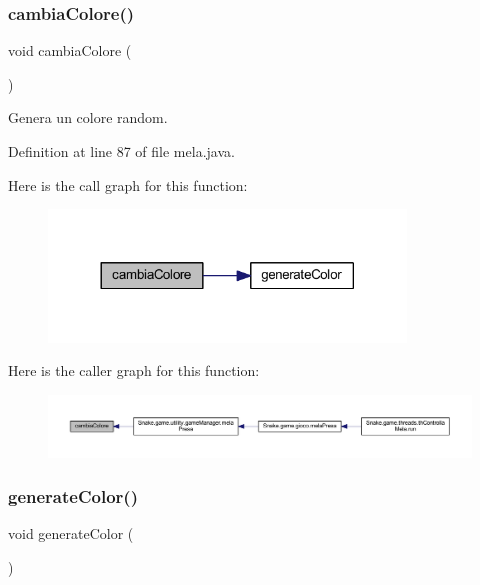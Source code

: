 \subsubsection{\texorpdfstring{cambia\+Colore()}{cambiaColore()}}
{\footnotesize\ttfamily void cambia\+Colore (\begin{DoxyParamCaption}{ }\end{DoxyParamCaption})}



Genera un colore random. 



Definition at line 87 of file mela.\+java.

Here is the call graph for this function\+:
\nopagebreak
\begin{figure}[H]
\begin{center}
\leavevmode
\includegraphics[width=269pt]{class_snake_1_1game_1_1vipera_1_1mela_a728ec55c7b71728d444fd811341f704c_cgraph}
\end{center}
\end{figure}
Here is the caller graph for this function\+:
\nopagebreak
\begin{figure}[H]
\begin{center}
\leavevmode
\includegraphics[width=350pt]{class_snake_1_1game_1_1vipera_1_1mela_a728ec55c7b71728d444fd811341f704c_icgraph}
\end{center}
\end{figure}
\mbox{\label{class_snake_1_1game_1_1vipera_1_1mela_a4f720f425b921900de19e238bcd0457a}} 
\subsubsection{\texorpdfstring{generate\+Color()}{generateColor()}}
{\footnotesize\ttfamily void generate\+Color (\begin{DoxyParamCaption}{ }\end{DoxyParamCaption})}



